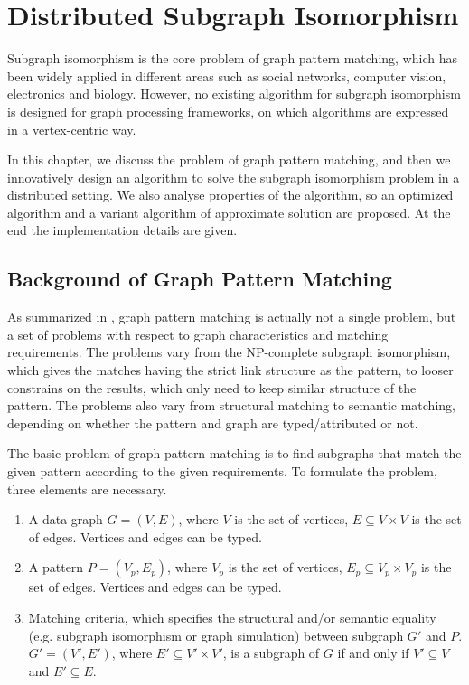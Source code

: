 \chapter{Distributed Subgraph Isomorphism}
\label{chap:c3}

Subgraph isomorphism is the core problem of graph pattern matching, which has been widely applied in different areas such as social networks, computer vision, electronics and biology. However, no existing algorithm for subgraph isomorphism is designed for graph processing frameworks, on which algorithms are expressed in a vertex-centric way. 

In this chapter, we discuss the problem of graph pattern matching, and then we innovatively design an algorithm to solve the subgraph isomorphism problem in a distributed setting. We also analyse properties of the algorithm, so an optimized algorithm and a variant algorithm of approximate solution are proposed. At the end the implementation details are given.

\section{Background of Graph Pattern Matching}

As summarized in \cite{gallagher2006matching}, graph pattern matching is actually not a single problem, but a set of problems with respect to graph characteristics and matching requirements. The problems vary from the NP-complete subgraph isomorphism, which gives the matches having the strict link structure as the pattern, to looser constrains on the results, which only need to keep similar structure of the pattern. The problems also vary from structural matching to semantic matching, depending on whether the pattern and graph are typed/attributed or not. 

The basic problem of graph pattern matching is to find subgraphs that match the given pattern according to the given requirements. To formulate the problem, three elements are necessary.

\begin{enumerate}
\item A data graph $G=(V, E)$, where $V$ is the set of vertices, $E \subseteq V \times V$ is the set of edges. Vertices and edges can be typed. 
\item A pattern $P=(V_p, E_p)$, where $V_p$ is the set of vertices, $E_p \subseteq V_p \times V_p$ is the set of edges. Vertices and edges can be typed.
\item Matching criteria, which specifies the structural and/or semantic equality (e.g. subgraph isomorphism or graph simulation) between subgraph $G'$ and $P$. $G'=(V',E')$, where $E' \subseteq V' \times V'$, is a subgraph of $G$ if and only if $V'\subseteq V$ and $E'\subseteq E$.
\end{enumerate}

